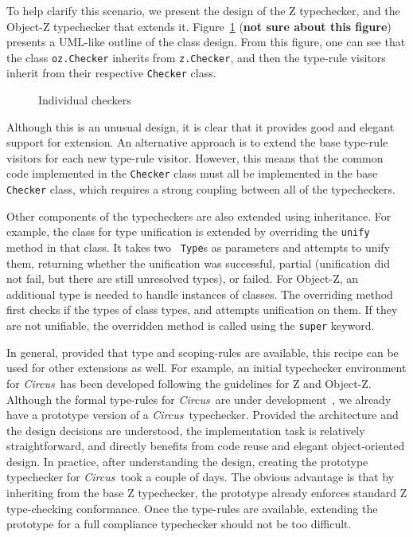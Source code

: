 \documentclass{llncs}
\newcommand{\Circus}{{\sf\slshape Circus}}
\begin{document}
To help clarify this scenario, we present the design of the Z typechecker, and the
Object-Z typechecker that extends it. Figure~\ref{tc-design} ({\bf not sure about this figure})
presents a UML-like outline of the class design. From this figure, one can see
that the class {\tt oz.Checker} inherits from {\tt z.Checker}, and then the type-rule visitors
inherit from their respective {\tt Checker} class.
%
\def\epsfsize#1#2{0.70#1}
\begin{figure}[t]
\begin{center}
\caption{Individual checkers}\label{tc-design}
\end{center}
\end{figure}
\def\epsfsize#1#2{\epsfxsize}
%
Although this is an unusual design, it is clear that it provides good and elegant support for extension.
An alternative approach is to extend the base type-rule visitors for each new type-rule visitor.
However, this means that the common code implemented in the {\tt Checker} class must all be
implemented in the base {\tt Checker} class, which requires a strong coupling between
all of the typecheckers.

Other components of the typecheckers are also extended using
inheritance.  For example, the class for type unification is extended
by overriding the {\tt unify} method in that class.  It takes two {\tt
Type}s as parameters and attempts to unify them, returning whether the
unification was successful, partial (unification did not fail, but
there are still unresolved types), or failed.  For Object-Z, an
additional type is needed to handle instances of classes.  The
overriding method first checks if the types of class types, and
attempts unification on them.  If they are not unifiable, the
overridden method is called using the {\tt super} keyword.

In general, provided that type and scoping-rules are available, this recipe
can be used for other extensions as well.
For example, an initial typechecker environment for \Circus\ has been developed following
the guidelines for Z and Object-Z. Although the formal type-rules for \Circus\ are under
development~\cite{circus.other:typechecker}, we already have a prototype version of a \Circus\ typechecker.
Provided the architecture and the design decisions are understood, the implementation task is relatively
straightforward, and directly benefits from code reuse and elegant object-oriented design.
In practice, after understanding the design, creating the prototype typechecker for \Circus\ took a couple
of days. The obvious advantage is that by inheriting from the base Z typechecker, the prototype already enforces
standard Z type-checking conformance. Once the type-rules are available, extending the prototype for
a full compliance typechecker should not be too difficult.
\end{document}
